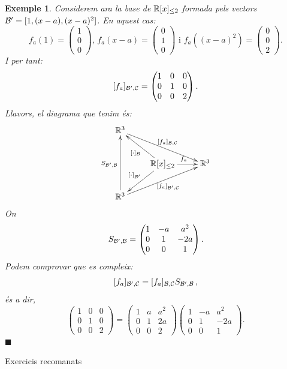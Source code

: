 \documentclass[
  11pt,
]{book}
\makeatletter
\numberwithin{dummy}{section}
\theoremstyle{maincolornumbox}
\theoremstyle{blacknumex}
\newtheorem{exampleT}{Exemple}[chapter]
\theoremstyle{blacknumbox}
\theoremstyle{maincolornum}
\newenvironment{example}{\begin{exampleT}}{\hfill{\tiny\ensuremath{\blacksquare}}\end{exampleT}}
\renewcommand{\section}{\@startsection{section}{1}{\z@}
{-4ex \@plus -1ex \@minus -.4ex}
{1ex \@plus.2ex }
{\normalfont\large\sffamily\bfseries}}
\makeatother
\begin{document}
\begin{example}
Considerem ara la base de \(\mathbb{R}[x]_{\leq2}\) formada pels vectors
\(\mathcal{B}'=[1,(x-a),(x-a)^2]\). En aquest cas:
\[f_a(1)=\begin{pmatrix} 1 \\ 0 \\ 0 \end{pmatrix}
\text{, }
f_a(x-a)=\begin{pmatrix} 0 \\ 1 \\ 0 \end{pmatrix}
\text{ i }
f_a((x-a)^2)=\begin{pmatrix} 0 \\ 0 \\ 2 \end{pmatrix}.\] I per tant:
\[[f_a]_{\mathcal{B}',\mathcal{C}}=\begin{pmatrix} 1 & 0 & 0 \\ 0 & 1 & 0 \\ 0 & 0 & 2\end{pmatrix}.\]
Llavors, el diagrama que tenim és: \[\xymatrix{
\R^3 \ar[rrd]^{[f_a]_{\calb,\calc}} &  & \\
 & \R[x]_{\leq2} \ar[ul]^{[\cdot]_\calb} \ar[r]^{f_a} \ar[dl]_{[\cdot]_{\calb'}} & \R^3 \\
\R^3 \ar[rru]_{[f_a]_{\calb',\calc}} \ar[uu]^{S_{\calb',\calb}} & &
}\] On
\[S_{\mathcal{B}',\mathcal{B}}=\begin{pmatrix} 1 & -a & a^2 \\ 0 & 1 & -2a \\ 0 & 0 & 1\end{pmatrix}.\]
Podem comprovar que es compleix:
\[[f_a]_{\mathcal{B}',\mathcal{C}}=[f_a]_{\mathcal{B},\mathcal{C}} S_{\mathcal{B}',\mathcal{B}} \,,\] és a
dir,
\[\begin{pmatrix} 1 & 0 & 0 \\ 0 & 1 & 0 \\ 0 & 0 & 2\end{pmatrix} = \begin{pmatrix} 1 & a & a^2 \\ 0 & 1 & 2a \\ 0 & 0 & 2\end{pmatrix} \begin{pmatrix} 1 & -a & a^2 \\ 0 & 1 & -2a \\ 0 & 0 & 1\end{pmatrix}.\]
\end{example}

\section{Exercicis recomanats}\label{exercicis-recomanats-1}
\end{document}
